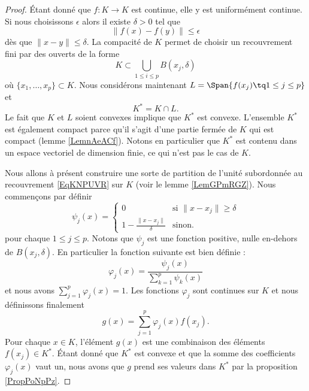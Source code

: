 \begin{proof}
    Étant donné que \( f\colon K\to K\) est continue, elle y est uniformément continue. Si nous choisissons \( \epsilon\) alors il existe \( \delta>0\) tel que 
    \begin{equation}
        \| f(x)-f(y) \|\leq \epsilon
    \end{equation}
    dès que \( \| x-y \|\leq \delta\). La compacité de \( K\) permet de choisir un recouvrement fini par des ouverts de la forme
    \begin{equation}    \label{EqKNPUVR}
        K\subset \bigcup_{1\leq i\leq p}B(x_j,\delta)
    \end{equation}
    où \( \{ x_1,\ldots, x_p \}\subset K\). Nous considérons maintenant \( L=\Span\{ f(x_j)\tq 1\leq j\leq p \}\) et
    \begin{equation}
        K^*=K\cap L.
    \end{equation}
    Le fait que \( K\) et \( L\) soient convexes implique que \( K^*\) est convexe. L'ensemble \( K^*\) est également compact parce qu'il s'agit d'une partie fermée de \( K\) qui est compact (lemme \ref{LemnAeACf}). Notons en particulier que \( K^*\) est contenu dans un espace vectoriel de dimension finie, ce qui n'est pas le cas de \( K\).

    Nous allons à présent construire une sorte de partition de l'unité subordonnée au recouvrement \eqref{EqKNPUVR} sur \( K\) (voir le lemme \ref{LemGPmRGZ}). Nous commençons par définir
    \begin{equation}
        \psi_j(x)=\begin{cases}
            0    &   \text{si } \| x-x_j \|\geq \delta\\
            1-\frac{ \| x-x_j \| }{ \delta }    &    \text{sinon}.
        \end{cases}
    \end{equation}
    pour chaque \( 1\leq j\leq p\). Notons que \( \psi_j\) est une fonction positive, nulle en-dehors de \( B(x_j,\delta)\). En particulier la fonction suivante est bien définie :
    \begin{equation}
        \varphi_j(x)=\frac{ \psi_j(x) }{ \sum_{k=1}^p\psi_k(x) }
    \end{equation}
    et nous avons \( \sum_{j=1}^p\varphi_j(x)=1\). Les fonctions \( \varphi_j\) sont continues sur \( K\) et nous définissons finalement
    \begin{equation}
        g(x)=\sum_{j=1}^p\varphi_j(x)f(x_j).
    \end{equation}
    Pour chaque \( x\in K\), l'élément \( g(x)\) est une combinaison des éléments \( f(x_j)\in K^*\). Étant donné que \( K^*\) est convexe et que la somme des coefficients \( \varphi_j(x)\) vaut un, nous avons que \( g\) prend ses valeurs dans \( K^*\) par la proposition \ref{PropPoNpPz}.


\end{proof}
